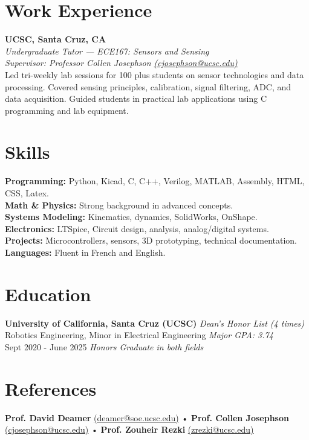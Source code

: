 \documentclass[a4paper,9pt]{article}
\begin{document}
\section*{Work Experience}
\textbf{UCSC, Santa Cruz, CA} \\
\textit{Undergraduate Tutor — ECE167: Sensors and Sensing } \\
\textit{Supervisor: Professor Collen Josephson \href{mailto:cjosephson@ucsc.edu}{(cjosephson@ucsc.edu)}} \\[0.3em]
Led tri-weekly lab sessions for 100 plus students on sensor technologies and data processing. Covered sensing principles, calibration, signal filtering, ADC, and data acquisition. Guided students in practical lab applications using C programming and lab equipment.

\section*{Skills}
\small
\textbf{Programming:} Python, Kicad, C, C++, Verilog, MATLAB, Assembly, HTML, CSS, Latex. \\
\textbf{Math \& Physics:} Strong background in advanced concepts. \\
\textbf{Systems Modeling:} Kinematics, dynamics, SolidWorks, OnShape. \\
\textbf{Electronics:} LTSpice, Circuit design, analysis, analog/digital systems. \\
\textbf{Projects:} Microcontrollers, sensors, 3D prototyping, technical documentation. \\
\textbf{Languages:} Fluent in French and English.
\normalsize

\section*{Education}
\small
\textbf{University of California, Santa Cruz (UCSC)} \hfill \textit{Dean's Honor List (4 times)} \\
Robotics Engineering, Minor in Electrical Engineering \hfill \textit{Major GPA: 3.74} \\
Sept 2020 - June 2025 \hfill \textit{Honors Graduate in both fields}

\section*{References}
\footnotesize
\textbf{Prof. David Deamer} \href{mailto:deamer@soe.ucsc.edu}{(deamer@soe.ucsc.edu)} • \textbf{Prof. Collen Josephson} \href{mailto:cjosephson@ucsc.edu}{(cjosephson@ucsc.edu)} • \textbf{Prof. Zouheir Rezki} \href{mailto:zrezki@ucsc.edu}{(zrezki@ucsc.edu)}
\normalsize
\end{document}
